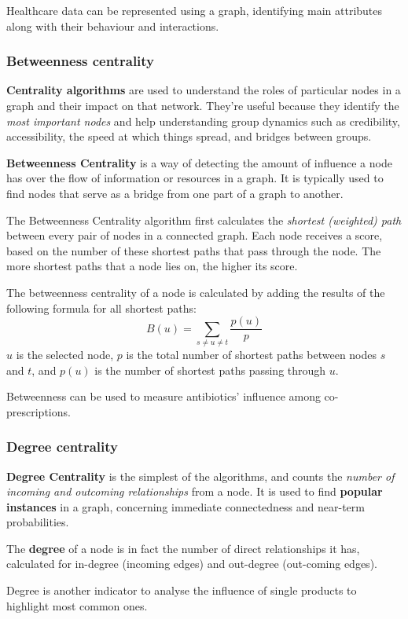 Healthcare data can be represented using a graph, identifying main attributes along with their behaviour and interactions. 

\subsubsection{Betweenness centrality}
\textbf{Centrality algorithms} are used to understand the roles of particular nodes in a graph and their impact on that network. They’re useful because they identify the \textit{most important nodes} and help understanding group dynamics such as credibility, accessibility, the speed at which things spread, and bridges between groups.

\textbf{Betweenness Centrality} is a way of detecting the amount of influence a node has over the flow of information or resources in a graph. It is typically used to find nodes that serve as a bridge from one part of a graph to another.

The Betweenness Centrality algorithm first calculates the \textit{shortest (weighted) path} between every pair of nodes in a connected graph. Each node receives a score, based on the number of these shortest paths that pass through the node. The more shortest paths that a node lies on, the higher its score.

The betweenness centrality of a node is calculated by adding the results of the following formula for all shortest paths:
$$B(u) = \sum_{s \neq u \neq t} \frac{p(u)}{p}$$
$u$ is the selected node, $p$ is the total number of shortest paths between nodes $s$ and $t$, and $p(u)$ is the number of shortest paths passing through $u$.

Betweenness can be used to measure antibiotics' influence among co-prescriptions.

\subsubsection{Degree centrality}
\textbf{Degree Centrality} is the simplest of the algorithms, and counts the \textit{number of incoming and outcoming relationships} from a node. It is used to find \textbf{popular instances} in a graph, concerning immediate connectedness and near-term probabilities. 

The \textbf{degree} of a node is in fact the number of direct relationships it has, calculated for in-degree (incoming edges) and out-degree (out-coming edges).

Degree is another indicator to analyse the influence of single products to highlight most common ones.

